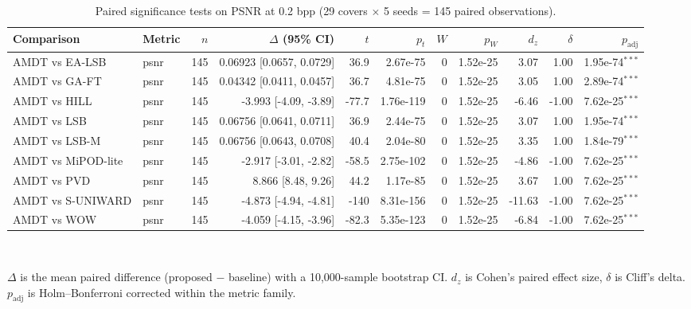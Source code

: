 \begin{table}[!t]
\centering
\caption{Paired significance tests on PSNR at 0.2 bpp (29 covers $\times$ 5 seeds = 145 paired observations).}
\label{tab:significance}
\footnotesize
\begin{tabular}{llrrrrrrrrr}
\toprule
Comparison & Metric & $n$ & $\Delta$ (95\% CI) & $t$ & $p_t$ & $W$ & $p_W$ & $d_z$ & $\delta$ & $p_{\text{adj}}$ \\
\midrule
AMDT vs EA-LSB & psnr & 145 & 0.06923 [0.0657, 0.0729] & 36.9 & 2.67e-75 & 0 & 1.52e-25 & 3.07 & 1.00 & 1.95e-74$^{***}$ \\
AMDT vs GA-FT & psnr & 145 & 0.04342 [0.0411, 0.0457] & 36.7 & 4.81e-75 & 0 & 1.52e-25 & 3.05 & 1.00 & 2.89e-74$^{***}$ \\
AMDT vs HILL & psnr & 145 & -3.993 [-4.09, -3.89] & -77.7 & 1.76e-119 & 0 & 1.52e-25 & -6.46 & -1.00 & 7.62e-25$^{***}$ \\
AMDT vs LSB & psnr & 145 & 0.06756 [0.0641, 0.0711] & 36.9 & 2.44e-75 & 0 & 1.52e-25 & 3.07 & 1.00 & 1.95e-74$^{***}$ \\
AMDT vs LSB-M & psnr & 145 & 0.06756 [0.0643, 0.0708] & 40.4 & 2.04e-80 & 0 & 1.52e-25 & 3.35 & 1.00 & 1.84e-79$^{***}$ \\
AMDT vs MiPOD-lite & psnr & 145 & -2.917 [-3.01, -2.82] & -58.5 & 2.75e-102 & 0 & 1.52e-25 & -4.86 & -1.00 & 7.62e-25$^{***}$ \\
AMDT vs PVD & psnr & 145 & 8.866 [8.48, 9.26] & 44.2 & 1.17e-85 & 0 & 1.52e-25 & 3.67 & 1.00 & 7.62e-25$^{***}$ \\
AMDT vs S-UNIWARD & psnr & 145 & -4.873 [-4.94, -4.81] & -140 & 8.31e-156 & 0 & 1.52e-25 & -11.63 & -1.00 & 7.62e-25$^{***}$ \\
AMDT vs WOW & psnr & 145 & -4.059 [-4.15, -3.96] & -82.3 & 5.35e-123 & 0 & 1.52e-25 & -6.84 & -1.00 & 7.62e-25$^{***}$ \\
\bottomrule
\end{tabular}
\\[2pt] \parbox{\linewidth}{\scriptsize $\Delta$ is the mean paired difference (proposed $-$ baseline) with a 10{,}000-sample bootstrap CI. $d_z$ is Cohen's paired effect size, $\delta$ is Cliff's delta. $p_{\text{adj}}$ is Holm--Bonferroni corrected within the metric family.}
\end{table}
